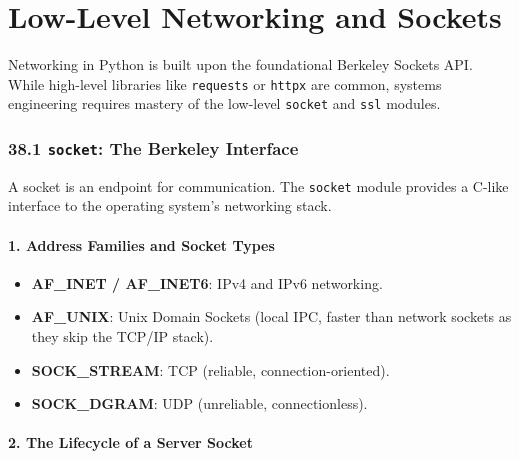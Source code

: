 \hypertarget{low-level-networking-and-sockets}{%
\chapter{Low-Level Networking and
Sockets}\label{low-level-networking-and-sockets}}

Networking in Python is built upon the foundational Berkeley Sockets
API. While high-level libraries like \passthrough{\lstinline!requests!}
or \passthrough{\lstinline!httpx!} are common, systems engineering
requires mastery of the low-level \passthrough{\lstinline!socket!} and
\passthrough{\lstinline!ssl!} modules.

\hypertarget{socket-the-berkeley-interface}{%
\subsection{\texorpdfstring{38.1 \texttt{socket}: The Berkeley
Interface}{38.1 socket: The Berkeley Interface}}\label{socket-the-berkeley-interface}}

A socket is an endpoint for communication. The
\passthrough{\lstinline!socket!} module provides a C-like interface to
the operating system's networking stack.

\hypertarget{address-families-and-socket-types}{%
\subsubsection{1. Address Families and Socket
Types}\label{address-families-and-socket-types}}

\begin{itemize}
\tightlist
\item
  \textbf{AF\_INET / AF\_INET6}: IPv4 and IPv6 networking.
\item
  \textbf{AF\_UNIX}: Unix Domain Sockets (local IPC, faster than network
  sockets as they skip the TCP/IP stack).
\item
  \textbf{SOCK\_STREAM}: TCP (reliable, connection-oriented).
\item
  \textbf{SOCK\_DGRAM}: UDP (unreliable, connectionless).
\end{itemize}

\hypertarget{the-lifecycle-of-a-server-socket}{%
\subsubsection{2. The Lifecycle of a Server
Socket}\label{the-lifecycle-of-a-server-socket}}

